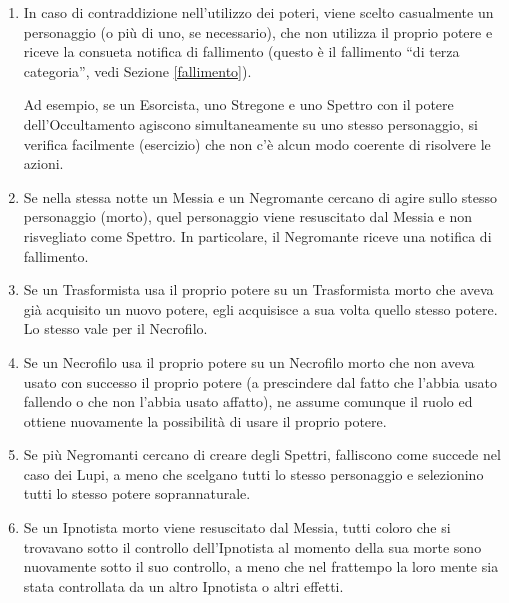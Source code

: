 \documentclass[a4paper,10pt]{article}
\begin{document}
\begin{enumerate}
 
 \item In caso di contraddizione nell'utilizzo dei poteri, viene scelto casualmente un personaggio (o più di uno, se necessario), che non utilizza il proprio potere e riceve la consueta notifica di fallimento (questo è il fallimento ``di terza categoria'', vedi Sezione \ref{fallimento}).
 
 Ad esempio, se un Esorcista, uno Stregone e uno Spettro con il potere dell'Occultamento agiscono simultaneamente su uno stesso personaggio, si verifica facilmente (esercizio) che non c'è alcun modo coerente di risolvere le azioni.
  
 \item Se nella stessa notte un Messia e un Negromante cercano di agire sullo stesso personaggio (morto), quel personaggio viene resuscitato dal Messia e non risvegliato come Spettro. In particolare, il Negromante riceve una notifica di fallimento.

 \item Se un Trasformista usa il proprio potere su un Trasformista morto che aveva già acquisito un nuovo potere, egli acquisisce a sua volta quello stesso potere. Lo stesso vale per il Necrofilo.
 
 \item Se un Necrofilo usa il proprio potere su un Necrofilo morto che non aveva usato con successo il proprio potere (a prescindere dal fatto che l'abbia usato fallendo o che non l'abbia usato affatto), ne assume comunque il ruolo ed ottiene nuovamente la possibilità di usare il proprio potere.
 
 
 \item Se più Negromanti cercano di creare degli Spettri, falliscono come succede nel caso dei Lupi, a meno che scelgano tutti lo stesso personaggio e selezionino tutti lo stesso potere soprannaturale.

 \item Se un Ipnotista morto viene resuscitato dal Messia, tutti coloro che si trovavano sotto il controllo dell'Ipnotista al momento della sua morte sono nuovamente sotto il suo controllo, a meno che nel frattempo la loro mente sia stata controllata da un altro Ipnotista o altri effetti.
 

\end{enumerate}
\end{document}
